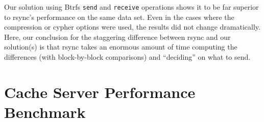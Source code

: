 Our solution using Btrfs \texttt{send} and \texttt{receive} operations shows it to be far superior to rsync’s performance on the same data set. Even in the cases where the compression or cypher options were used, the results did not change dramatically. Here, our conclusion for the staggering difference between rsync and our solution(s) is that rsync takes an enormous amount of time computing the differences (with block-by-block comparisons) and “deciding” on what to send.






\section{Cache Server Performance Benchmark}
\label{sub:eval_cache_bench}


